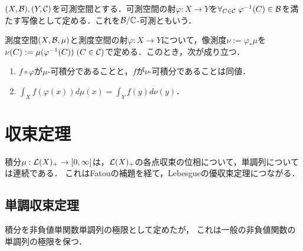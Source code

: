 \documentclass[uplatex, dvipdfmx]{jsreport}
\begin{document}
\begin{definition}
    $(X,\mathcal{B}),(Y,\mathcal{C})$を可測空間とする．可測空間の射$\varphi:X\to Y$を$\forall_{C\in\mathcal{C}}\;\varphi^{-1}(C)\in\mathcal{B}$を満たす写像として定める．これを$\mathcal{B}/\mathbb{C}$-可測ともいう．
\end{definition}

\begin{theorem}[変数変換]
    測度空間$(X,\mathcal{B},\mu)$と測度空間の射$\varphi:X\to Y$について，像測度$\nu:=\varphi_*\mu$を$\nu(C):=\mu(\varphi^{-1}(C))\;(C\in\mathcal{C})$で定める．このとき，次が成り立つ．
    \begin{enumerate}
        \item $f\circ\varphi$が$\mu$-可積分であることと，$f$が$\nu$-可積分であることは同値．
        \item $\int_Xf(\varphi(x))d\mu(x)=\int_Yf(y)d\nu(y)$．
    \end{enumerate}
\end{theorem}

\section{収束定理}

\begin{tcolorbox}[colframe=ForestGreen, colback=ForestGreen!10!white,breakable,colbacktitle=ForestGreen!40!white,coltitle=black,fonttitle=\bfseries\sffamily,
title=]
    積分$\mu:\mathcal{L}(X)_+\to[0,\infty]$は，$\mathcal{L}(X)_+$の各点収束の位相について，単調列については連続である．
    これはFatouの補題を経て，Lebesgueの優収束定理につながる．
\end{tcolorbox}

\subsection{単調収束定理}

\begin{tcolorbox}[colframe=ForestGreen, colback=ForestGreen!10!white,breakable,colbacktitle=ForestGreen!40!white,coltitle=black,fonttitle=\bfseries\sffamily,
title=]
    積分を非負値単関数単調列の極限として定めたが，
    これは一般の非負値関数の単調列の極限を保つ．
\end{tcolorbox}
\end{document}

